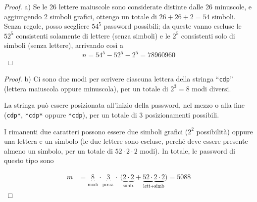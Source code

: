 \documentclass{beamer}
\begin{document}
\begin{frame}[fragile]
	\begin{proof}\renewcommand{\qedsymbol}{$\square$}
		a) Se le 26 lettere maiuscole sono considerate distinte dalle 26 minuscole, e aggiungendo 2 simboli grafici, ottengo un totale di $26+26+2=54$ simboli. Senza regole, posso scegliere $54^5$ password possibili; da queste vanno escluse le $52^5$ consistenti solamente di lettere (senza simboli) e le $2^5$ consistenti solo di simboli (senza lettere), arrivando così a
		$$
			n= 54^5 - 52^5- 2^5 = 78 960 960
		$$
		\qedhere
	\end{proof}
\end{frame}

\begin{frame}[fragile]
	\begin{proof}%
		b) Ci sono due modi per scrivere ciascuna lettera della stringa ``\texttt{cdp}'' (lettera maiuscola oppure minuscola), per un totale di $2^3=8$ modi diversi.

		\medskip

		La stringa pu\`o essere posizionata all'inizio della password, nel mezzo o alla fine (\texttt{cdp*}, \texttt{*cdp*} oppure \texttt{*cdp}), per un totale di 3 posizionamenti possibili.

		\medskip

		I rimanenti due caratteri possono essere due simboli grafici ($2^2$ possibilit\`a) oppure una lettera e un simbolo (le due lettere sono escluse, perch\'e deve essere presente almeno un simbolo, per un totale di $52\cdot2\cdot2$ modi). In totale, le password di questo tipo sono

		\begin{align*}
			m & = \underbracket{8}_{\text{modi}} \cdot \underbracket{3}_{\text{posiz.}} \cdot \: \big( \underbrace{2 \cdot 2}_{\text{simb.}} + \underbrace{52 \cdot 2 \cdot 2}_{\text{lett+simb}} \big) = 5088
		\end{align*}
	\end{proof}
\end{frame}
\end{document}

